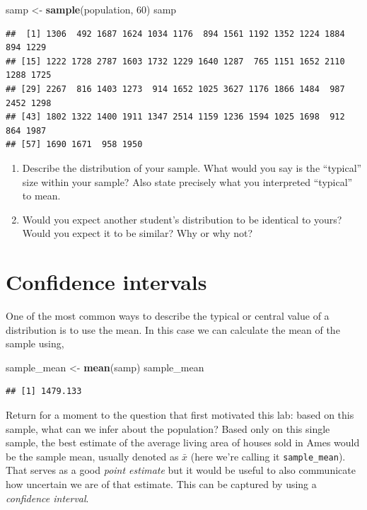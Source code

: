 \documentclass[]{book}
\newenvironment{Shaded}{\begin{snugshade}}{\end{snugshade}}
\newcommand{\KeywordTok}[1]{\textcolor[rgb]{0.13,0.29,0.53}{\textbf{{#1}}}}
\newcommand{\DecValTok}[1]{\textcolor[rgb]{0.00,0.00,0.81}{{#1}}}
\newcommand{\StringTok}[1]{\textcolor[rgb]{0.31,0.60,0.02}{{#1}}}
\newcommand{\NormalTok}[1]{{#1}}
\theoremstyle{definition}
\theoremstyle{definition}
\theoremstyle{remark}
\begin{document}
\begin{Shaded}
\begin{Highlighting}[]
\NormalTok{samp <-}\StringTok{ }\KeywordTok{sample}\NormalTok{(population, }\DecValTok{60}\NormalTok{)}
\NormalTok{samp}
\end{Highlighting}
\end{Shaded}

\begin{verbatim}
##  [1] 1306  492 1687 1624 1034 1176  894 1561 1192 1352 1224 1884  894 1229
## [15] 1222 1728 2787 1603 1732 1229 1640 1287  765 1151 1652 2110 1288 1725
## [29] 2267  816 1403 1273  914 1652 1025 3627 1176 1866 1484  987 2452 1298
## [43] 1802 1322 1400 1911 1347 2514 1159 1236 1594 1025 1698  912  864 1987
## [57] 1690 1671  958 1950
\end{verbatim}

\begin{enumerate}
\def\labelenumi{\arabic{enumi}.}
\item
  Describe the distribution of your sample. What would you say is the
  ``typical'' size within your sample? Also state precisely what you
  interpreted ``typical'' to mean.
\item
  Would you expect another student's distribution to be identical to
  yours? Would you expect it to be similar? Why or why not?
\end{enumerate}

\hypertarget{confidence-intervals}{\section*{Confidence
intervals}\label{confidence-intervals}}

One of the most common ways to describe the typical or central value of
a distribution is to use the mean. In this case we can calculate the
mean of the sample using,

\begin{Shaded}
\begin{Highlighting}[]
\NormalTok{sample_mean <-}\StringTok{ }\KeywordTok{mean}\NormalTok{(samp)}
\NormalTok{sample_mean}
\end{Highlighting}
\end{Shaded}

\begin{verbatim}
## [1] 1479.133
\end{verbatim}

Return for a moment to the question that first motivated this lab: based
on this sample, what can we infer about the population? Based only on
this single sample, the best estimate of the average living area of
houses sold in Ames would be the sample mean, usually denoted as
\(\bar{x}\) (here we're calling it \texttt{sample\_mean}). That serves
as a good \emph{point estimate} but it would be useful to also
communicate how uncertain we are of that estimate. This can be captured
by using a \emph{confidence interval}.
\end{document}
